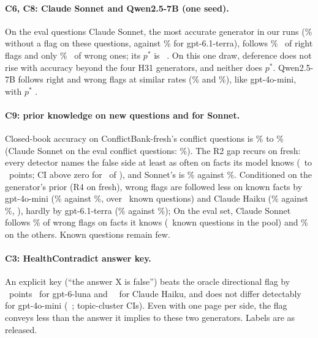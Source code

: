 \paragraph{C6, C8: Claude Sonnet and Qwen2.5-7B (one seed).} On the eval questions Claude Sonnet, the most accurate
generator in our runs (\cxRdSonnetPlain\% without a flag on these questions, against \cxRdTerraPlain\% for
gpt-6.1-terra), follows \cxRdSonnetFolR\% \cxRdSonnetFolRCI\ of right flags and only \cxRdSonnetFolW\%
\cxRdSonnetFolWCI\ of wrong ones; its $p^*$ is \cxRdSonnetBe\ \cxRdSonnetBeCI. On this one draw, deference does not
rise with accuracy beyond the four H31 generators, and neither does $p^*$. Qwen2.5-7B follows right and wrong flags at similar
rates (\cxRdQwenFolR\% and \cxRdQwenFolW\%), like gpt-4o-mini, with $p^*$ \cxRdQwenBe.

\paragraph{C9: prior knowledge on new questions and for Sonnet.} Closed-book accuracy on ConflictBank-fresh's
conflict questions is \cxClosedFreshMin\% to \cxClosedFreshMax\% (Claude Sonnet on the eval conflict questions:
\cxClosedSonnetEval\%). The R2 gap
recurs on fresh: every detector names the false side at least as often on facts its model knows
(\cxPriorFrDiffMin\ to \cxPriorFrDiffMax\ points; CI above zero for \cxPriorFrDiffPos\ of \cxPriorFrN), and Sonnet's
is \cxPriorSonnetKnown\% against \cxPriorSonnetUnknown\%. Conditioned on the generator's prior (R4 on fresh), wrong
flags are followed less on known facts by gpt-4o-mini (\cxFolFrMiniWKnown\% against \cxFolFrMiniWUnknown\%, over
\cxFolFrMiniWKnownN\ known questions) and Claude Haiku (\cxFolFrHaikuWKnown\% against \cxFolFrHaikuWUnknown\%,
\cxFolFrHaikuWKnownN), hardly by gpt-6.1-terra (\cxFolFrTerraWKnown\% against \cxFolFrTerraWUnknown\%); On the eval set,
Claude Sonnet follows \cxFolSonnetWKnown\% of wrong flags on facts it knows (\cxFolSonnetWKnownN\ known questions in
the pool) and \cxFolSonnetWUnknown\% on the others. Known questions remain few.

\paragraph{C3: HealthContradict answer key.} An explicit key (``the answer X is false'') beats the oracle directional
flag by \cxHcKeyDirLuna\ points \cxHcKeyDirLunaCI\ for gpt-6-luna and \cxHcKeyDirHaiku\ \cxHcKeyDirHaikuCI\ for Claude
Haiku, and does not differ detectably for gpt-4o-mini (\cxHcKeyDirMini\ \cxHcKeyDirMiniCI; topic-cluster CIs). Even
with one page per side, the flag conveys less than the answer it implies to these two generators. Labels are as
released.

